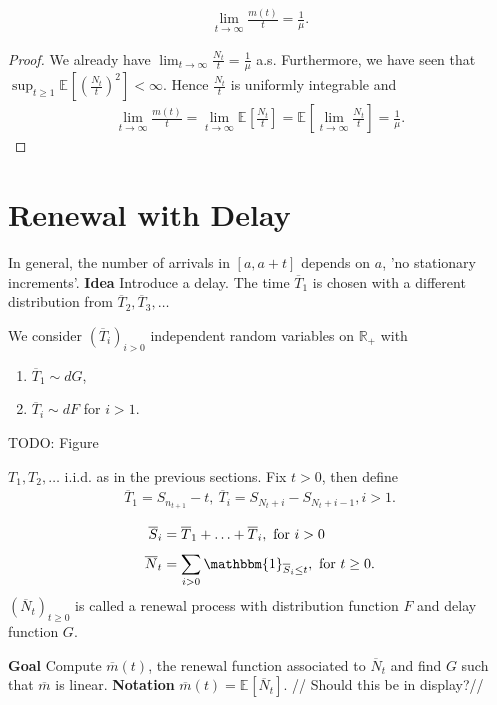 \begin{theorem}
	\begin{align}
		\boxed{\lim_{t \to \infty} \frac{m(t)}{t}=\frac{1}{\mu }.}
	\end{align}
\end{theorem}
\begin{proof}
	We {\color{blue}already} have $\lim_{t\to \infty }\frac{N_t}{t} = \frac{1}{\mu }$ a.s. Furthermore, we have seen that $\sup_{t\geq 1} \mathbb{E}_{} \left[ \left( \frac{N_t}{t} \right)^2 \right]< \infty  $. Hence $\frac{N_t}{t}$ is uniformly integrable and 
	\begin{align}
		\lim_{t\to \infty } \frac{m(t)}{t} = \lim_{t \to \infty } \mathbb{E}_{} \left[ \frac{N_t}{t} \right]  = \mathbb{E}_{} \left[ \lim_{t \to \infty } \frac{N_t}{t} \right] = \frac{1}{\mu }.
	\end{align}
\end{proof}

\section{Renewal with Delay}
In general, the number of arrivals in $[a, a+t]$ depends on $a$, 'no stationary increments'.
\textbf{Idea} Introduce a delay. The time $\overline{T}_{1}$ is chosen with a different distribution from $\overline{T}_{2}, \overline{T}_{3}, \ldots$

We consider $(\overline{T}_{i})_{i> 0}$ independent random variables on $\mathbb{R}_+$ with
\begin{enumerate}
	\item  $\overline{T}_{1} \sim dG$,
	\item $\overline{T}_{i} \sim dF$ for $i> 1$.
\end{enumerate}
{\color{blue} TODO: Figure}
\begin{ex}
	$T_1, T_2, \ldots$ i.i.d. as in the previous sections. Fix $t> 0$, then define
	\begin{align}
		\overline{T}_{1} = S_{n_{t+1}}-t, \ \overline{T}_{i}= S_{N_t +i} - S_{N_t + i -1}, i> 1.
	\end{align}
\end{ex}

\begin{defn}
	\begin{align}
		\overline{S}_{i} &= \overline{T}_1 + \ldots + \overline{T}_i, \textrm{ for } i> 0\\
		\overline{N}_t &= \sum_{i> 0}^{} \mathbbm{1}_{\overline{S}_i \leq t}, \textrm{ for } t\geq 0. 
	\end{align}
	$(\overline{N}_t)_{t\geq 0}$ is called a renewal process with distribution function $F$ and delay function $G$.	
\end{defn}
\noindent
\textbf{Goal} Compute $\overline{m}(t)${\color{blue},} the renewal function associated to $\overline{N}_t$ and find $G$ such that $\overline{m}$ is linear.
\noindent
\textbf{Notation} $\overline{m}(t) = \mathbb{E}_{} \left[ \overline{N}_t \right] $. {\color{blue}// Should this be in display?//}

